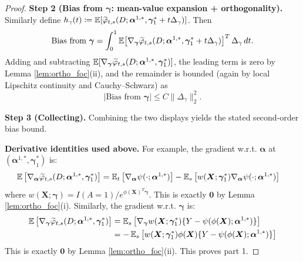 \documentclass{article}
\begin{document}
\begin{proof}
\textbf{Step 2 (Bias from $\boldsymbol{\gamma}$: mean-value expansion + orthogonality).}
Similarly define $h_\gamma(t)\coloneqq \operatorname{\mathbb{E}}[\widetilde{\varphi}_{t,s}(D;\boldsymbol{\alpha}^{1,*},\boldsymbol{\gamma}_1^*+t\Delta_\gamma)]$.
Then
\[
\text{Bias from } \boldsymbol{\gamma}
=
\int_0^1 \operatorname{\mathbb{E}}\!\left[\nabla_{\boldsymbol{\gamma}}\widetilde{\varphi}_{t,s}(D;\boldsymbol{\alpha}^{1,*},\boldsymbol{\gamma}_1^*+t\Delta_\gamma)\right]^T\Delta_\gamma\,dt.
\]
Adding and subtracting $\operatorname{\mathbb{E}}[\nabla_{\boldsymbol{\gamma}}\widetilde{\varphi}_{t,s}(D;\boldsymbol{\alpha}^{1,*},\boldsymbol{\gamma}_1^*)]$, the leading term is zero by Lemma \ref{lem:ortho_foc}(ii), and the remainder is bounded (again by local Lipschitz continuity and Cauchy--Schwarz) as
\[
\left|\text{Bias from } \boldsymbol{\gamma}\right|
\le
C\|\Delta_\gamma\|_2^2.
\]

\textbf{Step 3 (Collecting).}
Combining the two displays yields the stated second-order bias bound.

\textbf{Derivative identities used above.}
For example, the gradient w.r.t. $\boldsymbol{\alpha}$ at $(\boldsymbol{\alpha}^{1,*},\boldsymbol{\gamma}_1^*)$ is:
\[
\begin{aligned}
\operatorname{\mathbb{E}}\left[ \nabla_{\boldsymbol{\alpha}} \widetilde{\varphi}_{t,s}(D; \boldsymbol{\alpha}^{1,*}, \boldsymbol{\gamma}_1^*) \right]
&= \operatorname{\mathbb{E}}_t\left[ \nabla_{\boldsymbol{\alpha}} \psi(\cdot; \boldsymbol{\alpha}^{1,*}) \right]
- \operatorname{\mathbb{E}}_s\left[ w(\boldsymbol{X}; \boldsymbol{\gamma}_1^*) \nabla_{\boldsymbol{\alpha}} \psi(\cdot; \boldsymbol{\alpha}^{1,*}) \right]
\end{aligned}
\]
where $w(\boldsymbol{X}; \boldsymbol{\gamma}) = I(A=1)/e^{\phi(\boldsymbol{X})^T \boldsymbol{\gamma}}$.
This is exactly $\mathbf{0}$ by Lemma \ref{lem:ortho_foc}(i).
Similarly, the gradient w.r.t. $\boldsymbol{\gamma}$ is:
\[
\begin{aligned}
\operatorname{\mathbb{E}}\left[ \nabla_{\boldsymbol{\gamma}} \widetilde{\varphi}_{t,s}(D; \boldsymbol{\alpha}^{1,*}, \boldsymbol{\gamma}_1^*) \right]
&= \operatorname{\mathbb{E}}_s\left[
    \nabla_{\boldsymbol{\gamma}}w(\boldsymbol{X}; \boldsymbol{\gamma}_1^*)
    \{Y - \psi(\phi(\boldsymbol{X}); \boldsymbol{\alpha}^{1,*})\}
\right] \\
&= -\operatorname{\mathbb{E}}_s\left[
    w(\boldsymbol{X}; \boldsymbol{\gamma}_1^*)
    \phi(\boldsymbol{X})
    \{Y - \psi(\phi(\boldsymbol{X}); \boldsymbol{\alpha}^{1,*})\}
\right]
\end{aligned}
\]
This is exactly $\mathbf{0}$ by Lemma \ref{lem:ortho_foc}(ii).
This proves part 1.


\end{proof}
\end{document}
